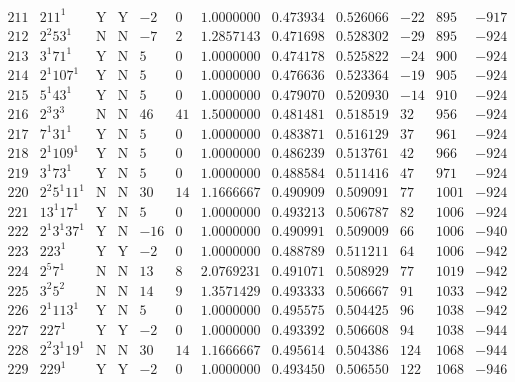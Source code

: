 \documentclass[11pt,reqno,a4letter]{article}
\numberwithin{figure}{section}
\numberwithin{table}{section}
\theoremstyle{plain}
\numberwithin{theorem}{section}
\theoremstyle{definition}
\begin{document}
\begin{table}[ht]
\begin{equation*}
{\begin{array}{cc|cc|ccc|cc|ccc}
 211 & 211^1 & \text{Y} & \text{Y} & -2 & 0 & 1.0000000 & 0.473934 & 0.526066 & -22 & 895 & -917 \\
 212 & 2^2 53^1 & \text{N} & \text{N} & -7 & 2 & 1.2857143 & 0.471698 & 0.528302 & -29 & 895 & -924 \\
 213 & 3^1 71^1 & \text{Y} & \text{N} & 5 & 0 & 1.0000000 & 0.474178 & 0.525822 & -24 & 900 & -924 \\
 214 & 2^1 107^1 & \text{Y} & \text{N} & 5 & 0 & 1.0000000 & 0.476636 & 0.523364 & -19 & 905 & -924 \\
 215 & 5^1 43^1 & \text{Y} & \text{N} & 5 & 0 & 1.0000000 & 0.479070 & 0.520930 & -14 & 910 & -924 \\
 216 & 2^3 3^3 & \text{N} & \text{N} & 46 & 41 & 1.5000000 & 0.481481 & 0.518519 & 32 & 956 & -924 \\
 217 & 7^1 31^1 & \text{Y} & \text{N} & 5 & 0 & 1.0000000 & 0.483871 & 0.516129 & 37 & 961 & -924 \\
 218 & 2^1 109^1 & \text{Y} & \text{N} & 5 & 0 & 1.0000000 & 0.486239 & 0.513761 & 42 & 966 & -924 \\
 219 & 3^1 73^1 & \text{Y} & \text{N} & 5 & 0 & 1.0000000 & 0.488584 & 0.511416 & 47 & 971 & -924 \\
 220 & 2^2 5^1 11^1 & \text{N} & \text{N} & 30 & 14 & 1.1666667 & 0.490909 & 0.509091 & 77 & 1001 & -924 \\
 221 & 13^1 17^1 & \text{Y} & \text{N} & 5 & 0 & 1.0000000 & 0.493213 & 0.506787 & 82 & 1006 & -924 \\
 222 & 2^1 3^1 37^1 & \text{Y} & \text{N} & -16 & 0 & 1.0000000 & 0.490991 & 0.509009 & 66 & 1006 & -940 \\
 223 & 223^1 & \text{Y} & \text{Y} & -2 & 0 & 1.0000000 & 0.488789 & 0.511211 & 64 & 1006 & -942 \\
 224 & 2^5 7^1 & \text{N} & \text{N} & 13 & 8 & 2.0769231 & 0.491071 & 0.508929 & 77 & 1019 & -942 \\
 225 & 3^2 5^2 & \text{N} & \text{N} & 14 & 9 & 1.3571429 & 0.493333 & 0.506667 & 91 & 1033 & -942 \\
 226 & 2^1 113^1 & \text{Y} & \text{N} & 5 & 0 & 1.0000000 & 0.495575 & 0.504425 & 96 & 1038 & -942 \\
 227 & 227^1 & \text{Y} & \text{Y} & -2 & 0 & 1.0000000 & 0.493392 & 0.506608 & 94 & 1038 & -944 \\
 228 & 2^2 3^1 19^1 & \text{N} & \text{N} & 30 & 14 & 1.1666667 & 0.495614 & 0.504386 & 124 & 1068 & -944 \\
 229 & 229^1 & \text{Y} & \text{Y} & -2 & 0 & 1.0000000 & 0.493450 & 0.506550 & 122 & 1068 & -946 \\

\end{array}}
\end{equation*}
\end{table}
\end{document}
